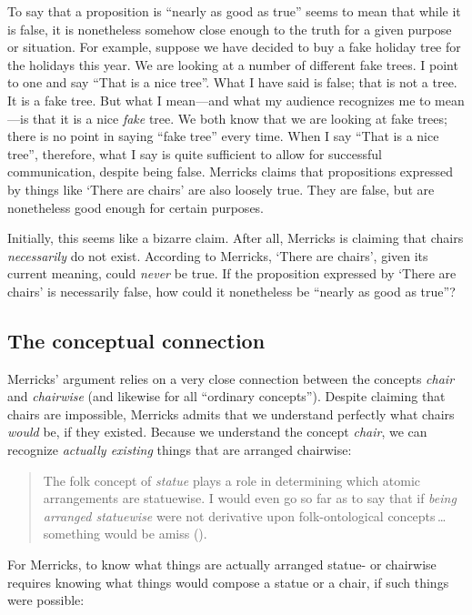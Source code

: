 \documentclass[12pt,twoside]{reedfancy}
\begin{document}
\begin{spacing}{1.25}
To say that a proposition is ``nearly as good as true'' seems to mean
that while it is false, it is nonetheless somehow close enough to the
truth for a given purpose or situation.  For example, suppose we have
decided to buy a fake holiday tree for the holidays this year.  We are
looking at a number of different fake trees.  I point to one and say
``That is a nice tree''.  What I have said is false; that is not a
tree.  It is a fake tree.  But what I mean---and what my audience
recognizes me to mean---is that it is a nice {\em fake} tree.  We both
know that we are looking at fake trees; there is no point in saying
``fake tree'' every time.  When I say ``That is a nice tree'',
therefore, what I say is quite sufficient to allow for successful
communication, despite being false.  Merricks claims that propositions
expressed by things like `There are chairs' are also loosely true.
They are false, but are nonetheless good enough for certain purposes.

Initially, this seems like a bizarre claim.  After all, Merricks is
claiming that chairs {\em necessarily} do not exist.  According to
Merricks, `There are chairs', given its current meaning, could {\em
  never} be true.  If the proposition expressed by `There are chairs'
is necessarily false, how could it nonetheless be ``nearly as good as
true''?

\subsection{The conceptual connection}
\label{connection}
Merricks' argument relies on a very close connection between the
concepts {\em chair} and {\em chairwise} (and likewise for all
``ordinary concepts'').  Despite claiming that chairs are impossible,
Merricks admits that we understand perfectly what chairs {\em would}
be, if they existed.  Because we understand the concept {\em chair},
we can recognize {\em actually existing} things that are arranged
chairwise:

\begin{quote}
The folk concept of \emph{statue} plays a role in determining which
atomic arrangements are statuewise. I would even go so far as to say
that if \emph{being arranged statuewise} were not derivative upon
folk-ontological concepts\,\ldots something would be amiss
(\citeyear[8]{merricks2001a}).
\end{quote}

For Merricks, to know what things are actually arranged statue- or
chairwise requires knowing what things would compose a statue or a
chair, if such things were possible:


\end{spacing}
\end{document}
